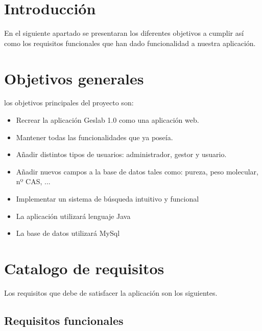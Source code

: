 
\section{Introducción}

En el siguiente apartado se presentaran los diferentes objetivos a cumplir así como los requisitos funcionales que han dado funcionalidad a nuestra aplicación.

\section{Objetivos generales}

los objetivos principales del proyecto son:

\begin{itemize}
	\item Recrear la aplicación Geslab 1.0 como una aplicación web.
	\item Mantener todas las funcionalidades que ya poseía.
	\item Añadir distintos tipos de usuarios: administrador, gestor y usuario.
	\item Añadir nuevos campos a la base de datos tales como: pureza, peso molecular, nº CAS, ...
	\item Implementar un sistema de búsqueda intuitivo y funcional
	\item La aplicación utilizará lenguaje Java
	\item La base de datos utilizará MySql
\end{itemize}

\section{Catalogo de requisitos}

Los requisitos que debe de satisfacer la aplicación son los siguientes.

\subsection{Requisitos funcionales}

